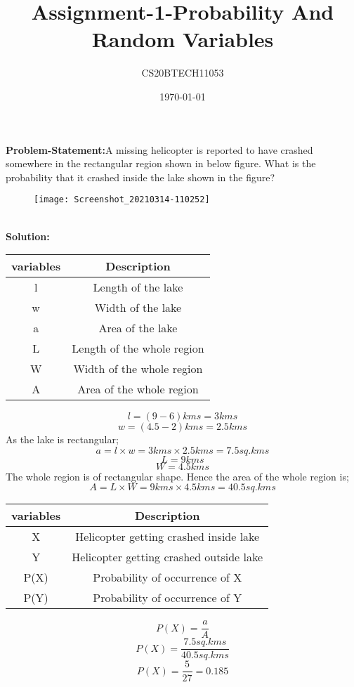 \documentclass[11pt,a4paper,twocolumn]{article}
\title{Assignment-1-Probability And Random Variables}
\author{CS20BTECH11053 }
\date{\today}
\begin{document}
\maketitle

\textbf{Problem-Statement:}A missing helicopter is reported to have crashed somewhere in the rectangular region shown in below figure. What is the probability that it crashed inside the lake shown in the figure?
\begin{figure}[h]
\centering
 \texttt{[image: Screenshot\_20210314-110252]}
\end{figure}
\\\textbf{Solution:}
\begin{table}[h!]
    \centering
    \begin{tabular}{|c|c|}
    \hline
        variables & Description\\
        \hline
        l&Length of the lake\\
        \hline
        w&Width of the lake\\
        \hline
        a&Area of the lake\\
        \hline
        L&Length of the whole region\\
        \hline
        W&Width of the whole region\\
        \hline
        A&Area of the whole region\\
        \hline
        \end{tabular}
        \label{tab:my_label}
\end{table}

$$l=(9-6)kms=3kms$$
$$w=(4.5-2)kms=2.5kms$$
As the lake is rectangular;
$$a={l}\times{w}={3kms}\times{2.5kms}=7.5sq.kms$$
$$L=9kms$$
$$W=4.5kms$$
The whole region is of rectangular shape. Hence the area of the whole region is;
$$A={L}\times{W}={9kms}\times{4.5kms}=40.5sq.kms$$
\begin{table}[h!]
    \centering
    \begin{tabular}{|c|c|}
    \hline
        variables & Description\\
        \hline
        X&Helicopter getting crashed inside lake\\
        \hline
        Y&Helicopter getting crashed outside lake\\
        \hline
        P(X)&Probability of occurrence of X\\
        \hline
        P(Y)&Probability of occurrence of Y\\
        \hline
        \end{tabular}
        \label{tab:my_label}
\end{table}

$$P(X)=\frac{a}{A}$$
$$P(X)=\frac{7.5sq.kms}{40.5sq.kms}$$
$$P(X)=\frac{5}{27}=0.185$$
\end{document}
